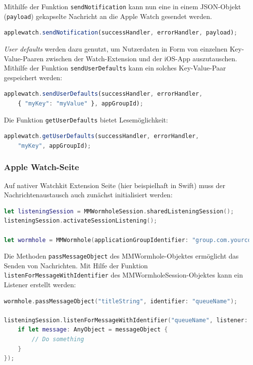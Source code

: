 Mithilfe der Funktion \texttt{sendNotification} kann nun eine in einem JSON-Objekt (\texttt{payload}) gekapselte Nachricht an die Apple Watch gesendet werden.  
\begin{lstlisting}[language=JavaScript]
applewatch.sendNotification(successHandler, errorHandler, payload);
\end{lstlisting}

\emph{User defaults} werden dazu genutzt, um Nutzerdaten in Form von einzelnen Key-Value-Paaren zwischen der Watch-Extension und der iOS-App auszutauschen. Mithilfe der Funktion \texttt{sendUserDefaults} kann ein solches Key-Value-Paar gespeichert werden:
\begin{lstlisting}[language=JavaScript, breaklines=true]
applewatch.sendUserDefaults(successHandler, errorHandler, 
    { "myKey": "myValue" }, appGroupId);
\end{lstlisting}
Die Funktion \texttt{getUserDefaults} bietet Lesemöglichkeit:
\begin{lstlisting}[language=JavaScript]
applewatch.getUserDefaults(successHandler, errorHandler, 
    "myKey", appGroupId);
\end{lstlisting}
%
%
\subsubsection{Apple Watch-Seite}
Auf nativer Watchkit Extension Seite (hier beispielhaft in Swift) muss der Nachrichtenaustausch auch zunächst initialisiert werden:
\begin{lstlisting}[language=swift, breaklines=true]
let listeningSession = MMWormholeSession.sharedListeningSession();
listeningSession.activateSessionListening();

let wormhole = MMWormhole(applicationGroupIdentifier: "group.com.yourcompany", optionalDirectory: nil, transitingType: .SessionContext);
\end{lstlisting}

Die Methoden \texttt{passMessageObject} des MMWormhole-Objektes ermöglicht das Senden von Nachrichten. Mit Hilfe der Funktion \texttt{listenForMessageWithIdentifier} des MMWormholeSession-Objektes kann ein Listener erstellt werden:
\begin{lstlisting}[language=swift, breaklines=true]
wormhole.passMessageObject("titleString", identifier: "queueName");

listeningSession.listenForMessageWithIdentifier("queueName", listener: { (messageObject) -> Void in
    if let message: AnyObject = messageObject {
        // Do something
    }
});
\end{lstlisting}


